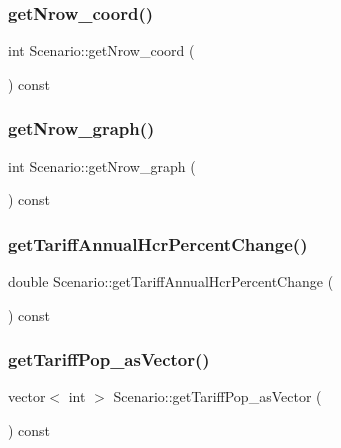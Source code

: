 \mbox{\label{class_scenario_aca9437e372aeac639be285952d401b0c}} 
\subsubsection{\texorpdfstring{getNrow\_coord()}{getNrow\_coord()}}
{\footnotesize\ttfamily int Scenario\+::get\+Nrow\+\_\+coord (\begin{DoxyParamCaption}{ }\end{DoxyParamCaption}) const}

\mbox{\label{class_scenario_ab237b4c511089a76c7c1cc7050c3d523}} 
\subsubsection{\texorpdfstring{getNrow\_graph()}{getNrow\_graph()}}
{\footnotesize\ttfamily int Scenario\+::get\+Nrow\+\_\+graph (\begin{DoxyParamCaption}{ }\end{DoxyParamCaption}) const}

\mbox{\label{class_scenario_a579b7999efc4bd86fdc727ac554d960b}} 
\subsubsection{\texorpdfstring{getTariffAnnualHcrPercentChange()}{getTariffAnnualHcrPercentChange()}}
{\footnotesize\ttfamily double Scenario\+::get\+Tariff\+Annual\+Hcr\+Percent\+Change (\begin{DoxyParamCaption}{ }\end{DoxyParamCaption}) const}

\mbox{\label{class_scenario_a86cb4dc5e33b8a8300dea84a8039d8b4}} 
\subsubsection{\texorpdfstring{getTariffPop\_asVector()}{getTariffPop\_asVector()}}
{\footnotesize\ttfamily vector$<$ int $>$ Scenario\+::get\+Tariff\+Pop\+\_\+as\+Vector (\begin{DoxyParamCaption}{ }\end{DoxyParamCaption}) const}

